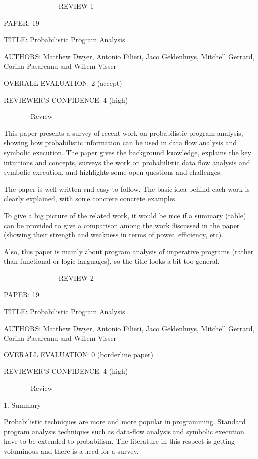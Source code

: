 \documentclass[12pm]{article}
\begin{document}
----------------------- REVIEW 1 ---------------------

PAPER: 19

TITLE: Probabilistic Program Analysis

AUTHORS: Matthew Dwyer, Antonio Filieri, Jaco Geldenhuys, Mitchell Gerrard, Corina Pasareanu and Willem Visser

OVERALL EVALUATION: 2 (accept)

REVIEWER'S CONFIDENCE: 4 (high)

----------- Review -----------

This paper presents a survey of recent work on probabilistic
program analysis, showing how probabilistic information can be
used in data flow analysis and symbolic execution. The paper
gives the background knowledge, explains the key intuitions and
concepts, surveys the work on probabilistic data flow analysis
and symbolic execution, and highlights some open questions and
challenges.

The paper is well-written and easy to follow. The basic idea
behind each work is clearly explained, with some concrete
concrete examples.

To give a big picture of the related work, it would be nice if a
summary (table) can be provided to give a comparison among the
work discussed in the paper (showing their strength and weakness
in terms of power, efficiency, etc).

Also, this paper is mainly about program analysis of imperative
programs (rather than functional or logic languages), so the
title looks a bit too general.


----------------------- REVIEW 2 ---------------------

PAPER: 19

TITLE: Probabilistic Program Analysis

AUTHORS: Matthew Dwyer, Antonio Filieri, Jaco Geldenhuys, Mitchell Gerrard, Corina Pasareanu and Willem Visser

OVERALL EVALUATION: 0 (borderline paper)

REVIEWER'S CONFIDENCE: 4 (high)

----------- Review -----------

1. Summary

Probabilistic techniques are more and more popular in programming.
Standard program analysis techniques such as data-flow analysis
and symbolic execution have to be extended to probabilism. The
literature in this respect is getting voluminous and there is a
need for a survey.
\end{document}
